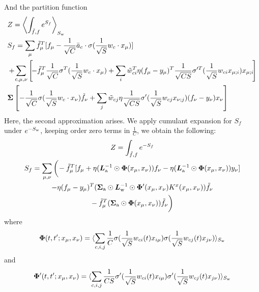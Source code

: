 And the partition function
\begin{align}
    &Z=
\left\langle
    \int_{\tilde{f},f}
    e^{S_f} 
    \right\rangle_{S_{\rm w}}
   \\ \nonumber
   &S_f=\sum\limits_{\mu}\tilde{f}_{\mu}^T[f_{\mu}-\frac{1}{\sqrt{C}} \bar{a}_c\cdot \sigma(\frac{1}{\sqrt{S}} w_c\cdot x_{\mu})] 
   \\ \nonumber&+\!\sum\limits_{c,\mu,\nu}\left[\!-\tilde{f}_{\mu}^T
\frac{1}{\sqrt{C}}  \sigma^T(\frac{1}{\sqrt{S}} w_c\cdot x_{\mu})
+
\sum\limits_{i}\tilde{w}_{ci}^T
\eta (f_{\mu}-y_\mu)^T\frac{1}{\sqrt{CS}} \sigma'^T(\frac{1}{\sqrt{S}} w_{ci} x_{\mu;i}) x_{\mu;i}\!\right] 
\\ \nonumber &\bm{\Sigma}
\left[-\frac{1}{\sqrt{C}}  \sigma(\frac{1}{\sqrt{S}} w_c\cdot x_{\nu}) \tilde{f}_{\nu}
+
\sum\limits_{j}\tilde{w}_{cj}
\eta  \frac{1}{\sqrt{CS}} \sigma'(\frac{1}{\sqrt{S}} w_{cj} x_{\nu;j}) (f_{\nu}-y_\nu) x_{\nu}\right]
\end{align}
Here, the second approximation arises. We apply cumulant expansion for $S_f$ under $e^{-S_{\rm w}}$, keeping order zero terms in $\frac{1}{C}$, we obtain the following:
\begin{gather}
Z=\int_{\tilde{f},f}
    e^{-S_{f}}
    \\ \nonumber
    S_{f}=\sum\limits_{\mu,\nu}\bigg(\!-\tilde{f}_{\mu}^T[f_{\mu}+
    \eta(\bm{L}^{-1}_{\rm a}\odot\bm{\Phi}(x_\mu,x_\nu))f_{\nu}-\eta(\bm{L}^{-1}_{\rm a}\odot\bm{\Phi}(x_\mu,x_\nu))y_{\nu}]\bigg.\\ \nonumber
     -\eta (f_{\mu}-y_\mu)^T(\bm{\Sigma}_{\rm a}\odot\bm{L}^{-1}_{\rm w}\odot\bm{\Phi}'(x_\mu,x_\nu) K^x({x_\mu,x_\nu})) \tilde{f}_{\nu}
     \\ \nonumber\bigg.\!- \tilde{f}_{\mu}^T (\bm{\Sigma}_{\rm a}\odot\bm{\Phi}(x_\mu,x_\nu)) \tilde{f}_{\nu}\bigg)
\end{gather}
where
\begin{equation}
    \bm{\Phi}(t,t';x_\mu,x_\nu)=\langle\sum\limits_{c,i,j}\frac{1}{C}\sigma(\frac{1}{\sqrt{S}}w_{ci}(t) x_{i\mu})\sigma(\frac{1}{\sqrt{S}}w_{cj}(t)x_{j\nu})\rangle_{S_{\rm w}}
\end{equation}
and
\begin{equation}
\bm{\Phi}'(t,t';x_\mu,x_\nu)=\langle\sum\limits_{c,i,j}\frac{1}{CS}\sigma'(\frac{1}{\sqrt{S}}w_{ci}(t) x_{i\mu})\sigma'(\frac{1}{\sqrt{S}}w_{cj}(t)x_{j\nu})\rangle_{S_{\rm w}}    
\end{equation}

